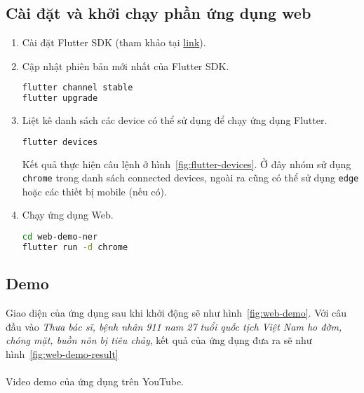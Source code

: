 \subsection{Cài đặt và khởi chạy phần ứng dụng web}
\begin{enumerate}
\item Cài đặt Flutter SDK (tham khảo tại \href{https://docs.flutter.dev/get-started/install}{link}).

\item Cập nhật phiên bản mới nhất của Flutter SDK.
\lstset{style=mystyle}
\begin{lstlisting}[language=bash]
flutter channel stable
flutter upgrade
\end{lstlisting}

\item Liệt kê danh sách các device có thể sử dụng để chạy ứng dụng Flutter.
\begin{lstlisting}[language=bash]
flutter devices
\end{lstlisting}
Kết quả thực hiện câu lệnh ở hình~\ref{fig:flutter-devices}. Ở đây nhóm sử dụng \texttt{chrome} trong danh sách connected devices, ngoài ra cũng có thể sử dụng \texttt{edge} hoặc các thiết bị mobile (nếu có).

\item Chạy ứng dụng Web.
\begin{lstlisting}[language=bash]
cd web-demo-ner
flutter run -d chrome
\end{lstlisting}
\end{enumerate}

\subsection{Demo}
Giao diện của ứng dụng sau khi khởi động sẽ như hình~\ref{fig:web-demo}. Với câu đầu vào \textit{Thưa bác sĩ, bệnh nhân 911 nam 27 tuổi quốc tịch Việt Nam ho đờm, chóng mặt, buồn nôn
bị tiêu chảy}, kết quả của ứng dụng đưa ra sẽ như hình~\ref{fig:web-demo-result}
\\\\
Video demo của ứng dụng trên YouTube.